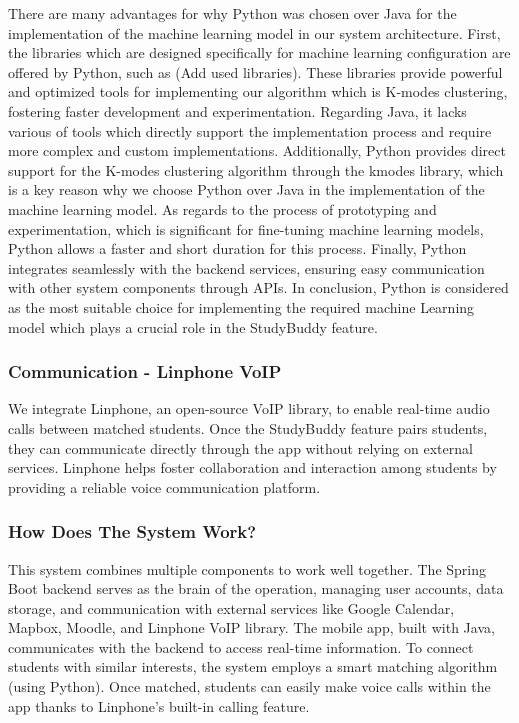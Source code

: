 \documentclass[12pt]{article}
\begin{document}
There are many advantages for why Python was chosen over Java for the implementation of the machine learning model in our system architecture. First, the libraries which are designed specifically for machine learning configuration are offered by Python, such as (Add used libraries). These libraries provide powerful and optimized tools for implementing our algorithm which is K-modes clustering, fostering faster development and experimentation.
Regarding Java, it lacks various of tools which directly support the implementation process and require more complex and custom implementations. Additionally, Python provides direct support for the K-modes clustering algorithm through the kmodes library, which is a key reason why we choose Python over Java in the implementation of the machine learning model.
As regards to the process of prototyping and experimentation, which is significant for fine-tuning machine learning models, Python allows a faster and short duration for this process. Finally, Python integrates seamlessly with the backend services, ensuring easy communication with other system components through APIs.
In conclusion, Python is considered as the most suitable choice for implementing the required machine Learning model which plays a crucial role in the StudyBuddy feature.

\subsubsection{Communication - Linphone VoIP}
We integrate Linphone, an open-source VoIP library, to enable real-time audio calls between matched students. 
Once the StudyBuddy feature pairs students, they can communicate directly through the app without relying on external services. 
Linphone helps foster collaboration and interaction among students by providing a reliable voice communication platform.

\subsubsection{How Does The System Work?}
This system combines multiple components to work well together.
The Spring Boot backend serves as the brain of the operation, managing user accounts, data storage, and communication with external services like Google Calendar, Mapbox, Moodle, and Linphone VoIP library.
The mobile app, built with Java, communicates with the backend to access real-time information. To connect students with similar interests, the system employs a smart matching algorithm (using Python). 
Once matched, students can easily make voice calls within the app thanks to Linphone's built-in calling feature. \\
\end{document}
